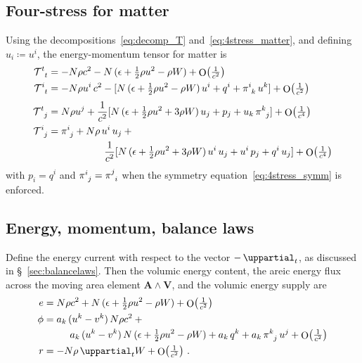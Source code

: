\documentclass[a4paper,12pt,%
onecolumn,oneside,article,%
british%
]{memoir}
\theoremstyle{remark}
\theoremstyle{innote}
\newcommand*{\de}{\mathop{}\!\uppartial}%
\DeclareMathOperator{\Ord}{O}%
\newcommand*{\defd}{\coloneqq}
\renewcommand*{\|}[1][]{\nonscript\:#1\vert\nonscript\:\mathopen{}}
\newcommand*{\sect}{\S}%
\newcommand*{\cf}{{cf.}}
\renewcommand*{\i}{{}\indices}
\newcommand*{\se}[1]{\de_{#1}}
\newcommand*{\yT}{\mathcal{T}}
\newcommand*{\ye}{e}
\newcommand*{\yW}{W}
\newcommand*{\Oc}[1]{\Ord\bigl(\tfrac{1}{c^{#1}}\bigr)}
\begin{document}
\subsection{Four-stress for matter}
\label{sec:GCRS_fourstress}

Using the decompositions~\eqref{eq:decomp_T} and~\eqref{eq:4stress_matter}, and defining $u_{i}\defd u^{i}$, the energy-momentum tensor for matter is \autocites[\cf][\sect\,8.1.2, where it is assumed that there's no heat flux and that the 3-stress is isotropic]{poissonetal2014}
\begin{equation}
  \label{eq:fourstress_matter_GCRS}
  \begin{aligned}
    \yT\i{^{t}_{t}} &=
    - N\rho c^{2} -N\,(\epsilon + \tfrac12 \rho u^{2} - \rho\yW) + \Oc{2}
    \\
    \yT\i{^{i}_{t}} &=
    -  N\rho u^{i}\, c^{2} -
    [N\,(\epsilon + \tfrac12\rho u^{2} -\rho\yW)\,u^{i} +
    q^{i} + \pi\i{^{i}_{k}}\,u^{k}] + \Oc{2}
    \\[\jot]
    \yT\i{^{t}_{j}} &=
    N\rho u^{j} + \frac{1}{c^{2}} [
    N\,(\epsilon + \tfrac12 \rho u^{2} + 3\rho\yW)\,u_{j} +
    p_{j} + u_{k}\,\pi\i{^{k}_{j}} ] + \Oc{4}
    \\
    \yT\i{^{i}_{j}} &=
    \!\begin{multlined}[t][0.8\linewidth]
      \pi\i{^{i}_{j}} + N\rho \,u^{i}\,u_{j} + {}\\
      \frac{1}{c^{2}} [
      N\,(\epsilon + \tfrac12 \rho u^{2} + 3\rho\yW)\,u^{i}\,u_{j} +
      u^{i}\,p_{j} + q^{i}\,u_{j}] + \Oc{4}
    \end{multlined}
  \end{aligned}
\end{equation}
with $p_{i}=q^{i}$ and $\pi\i{^{i}_{j}}=\pi\i{^{j}_{i}}$ when the symmetry equation~\eqref{eq:4stress_symm} is enforced.


\subsection{Energy, momentum, balance laws}
\label{sec:GCRS_energy_momentum}

Define the energy current with respect to the vector $-\se{t}$, as discussed in \sect~\ref{sec:balancelaws}. Then the volumic energy content, the areic energy flux across the moving area element $\bm{A}\land\bm{V}$, and the volumic energy supply are
\begin{equation}
  \label{eq:energy_matter_GCRS}
  \begin{aligned}
    \ye &=
    N\rho c^{2} + N\,(\epsilon + \tfrac12 \rho u^{2} - \rho\yW) + \Oc{2}
    \\
    \phi &=
    \!\begin{multlined}[t][0.8\linewidth]
      a_{k}\,(u^{k}-v^{k})\,N\rho c^{2} +{}\\
      a_{k}\,(u^{k}-v^{k})\,N\,(\epsilon + \tfrac12 \rho u^{2} - \rho\yW) +
      a_{k}\,q^{k} + a_{k}\,\pi\i{^{k}_{j}}\,u^{j} +
      \Oc{2}
    \end{multlined}
    \\
    r &= - N\rho\de_{t}\yW + \Oc{2} \ .
  \end{aligned}
\end{equation}
\end{document}

